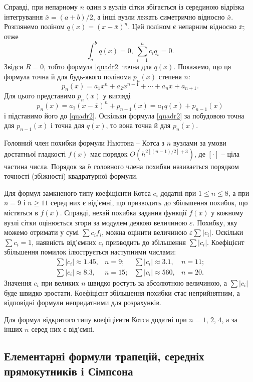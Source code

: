 \documentclass[14pt,twoside]{extreport}
\theoremstyle{mystyle}
\numberwithin{equation}{chapter}
\begin{document}
Справді, при непарному $n$ один з вузлів сітки збігається із серединою відрізка інтегрування $\bar{x} = (a + b)/2$, а інші вузли лежать симетрично відносно $\bar{x}$. Розглянемо поліном $q(x) = (x-\bar{x})^n$. Цей поліном є непарним відносно $\bar{x}$; отже
\[
\int_{a}^{b}q(x)=0,\ \sum_{i=1}^{n}c_{i}q_{i}=0.
\]
Звідси $R = 0$, тобто формула \eqref{quadr2} точна для $q(x)$. Покажемо, що ця формула точна й для будь-якого полінома $p_n(x)$ степеня $n$:
\[
p_{n}(x)=a_{1}x^{n}+a_{2}x^{n-1}+\cdots+a_{n}x+a_{n+1}.
\]
Для цього представимо $p_n(x)$ у вигляді
\[
p_{n}(x)=a_{1}(x-\overline{x})^{n}+p_{n-1}(x)=a_{1}q(x)+p_{n-1}(x)
\]
і підставимо його до \eqref{quadr2}. Оскільки формула \eqref{quadr2} за побудовою точна для $p_{n-1}(x)$ і точна для $q(x)$, то вона точна й для $p_n(x)$.

Головний член похибки формули Ньютона -- Котса з $n$ вузлами за умови достатньої гладкості $f(x)$ має порядок $O\left(h^{2[(n-1)/2]+3}\right)$, де $[\cdot]$ -- ціла частина числа. Порядок за $h$ головного члена похибки називається порядком точності (збіжності) квадратурної формули.

Для формул замкненого типу коефіцієнти Котса $c_i$ додатні при $1 \leqslant n \leqslant 8$, а при $n = 9$ і $n \geqslant 11$ серед них є від'ємні, що призводить до збільшення похибок, що містяться в $f(x)$. Справді, нехай похибка задання функції $f(x)$ у кожному вузлі сітки оцінюється згори за модулем деякою величиною $\varepsilon$. Похибку, яку можемо отримати у сумі $\sum c_i f_i$, можна оцінити величиною $\varepsilon\sum |c_i|$. Оскільки $\sum c_i =1$, наявність від'ємних $c_i$ призводить до збільшення $\sum|c_i|$. Коефіцієнт збільшення помилок ілюструється наступними числами:
\[
\begin{array}{llll}
\displaystyle \sum|c_{i}|\approx 1.45, & n=9; &\sum|c_{i}|\approx 3.1, & n=11;\\
\displaystyle \sum|c_{i}|\approx 8.3, & n=15; & \sum|c_{i}|\approx 560, & n=20.
\end{array}
\]
Значення $c_i$ при великих $n$ швидко ростуть за абсолютною величиною, а $\sum|c_i|$ буде швидко зростати. Коефіцієнт збільшення похибки стає неприйнятним, а відповідні формули непридатними для розрахунків.

Для формул відкритого типу коефіцієнти Котса додатні при $n = 1$, $2$, $4$, а за інших $n$ серед них є від'ємні.

\subsection{Елементарні формули трапецій, середніх прямокутників і Сімпсона}
\end{document}
